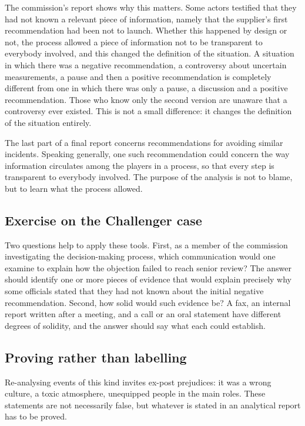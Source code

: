 The commission's report shows why this matters. Some actors testified that they had not known a relevant piece of information, namely that the supplier's first recommendation had been not to launch. Whether this happened by design or not, the process allowed a piece of information not to be transparent to everybody involved, and this changed the definition of the situation. A situation in which there was a negative recommendation, a controversy about uncertain measurements, a pause and then a positive recommendation is completely different from one in which there was only a pause, a discussion and a positive recommendation. Those who know only the second version are unaware that a controversy ever existed. This is not a small difference: it changes the definition of the situation entirely.

The last part of a final report concerns recommendations for avoiding similar incidents. Speaking generally, one such recommendation could concern the way information circulates among the players in a process, so that every step is transparent to everybody involved. The purpose of the analysis is not to blame, but to learn what the process allowed.

\subsection{Exercise on the Challenger case}
Two questions help to apply these tools. First, as a member of the commission investigating the decision-making process, which communication would one examine to explain how the objection failed to reach senior review? The answer should identify one or more pieces of evidence that would explain precisely why some officials stated that they had not known about the initial negative recommendation. Second, how solid would such evidence be? A fax, an internal report written after a meeting, and a call or an oral statement have different degrees of solidity, and the answer should say what each could establish.

\subsection{Proving rather than labelling}
Re-analysing events of this kind invites ex-post prejudices: it was a wrong culture, a toxic atmosphere, unequipped people in the main roles. These statements are not necessarily false, but whatever is stated in an analytical report has to be proved.

